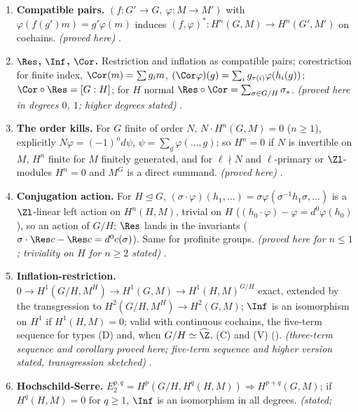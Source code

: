 \begin{enumerate}[label=\textbf{\thechapter.\arabic*}]
$\#A[\ell]\le\ell$ is cyclic of length the largest $k$ with an element of order $\ell^k$; if $\#H^0(G,T/\ell T)\le\ell$, $H^0(G,W)$ is finite cyclic or $\simeq\Qlmod$, and when finite its
length is the largest $k$ with an invariant element of $T/\ell^kT$ outside $\ell T/\ell^kT$. \emph{(proved here, given )} .
\item \textbf{Compatible pairs.} $(f\colon G'\to G,\ \varphi\colon M\to M')$ with $\varphi(f(g')m)=g'\varphi(m)$ induces $(f,\varphi)^*\colon H^n(G,M)\to H^n(G',M')$ on cochains. \emph{(proved here)}
.
\item \textbf{$\Res$, $\Inf$, $\Cor$.} Restriction and inflation as compatible pairs; corestriction for finite index, $\Cor(m)=\sum g_im$, $(\Cor\varphi)(g)=\sum_ig_{\tau(i)}\varphi(h_i(g))$;
$\Cor\circ\Res=[G:H]$; for $H$ normal $\Res\circ\Cor=\sum_{\sigma\in G/H}\sigma_*$. \emph{(proved here in degrees $0$, $1$; higher degrees stated)} .
\item \textbf{The order kills.} For $G$ finite of order $N$, $N\cdot H^n(G,M)=0$ ($n\ge1$), explicitly $N\varphi=(-1)^nd\psi$, $\psi=\sum_g\varphi(\dots,g)$; so $H^n=0$ if $N$ is invertible on $M$,
$H^n$ finite for $M$ finitely generated, and for $\ell\nmid N$ and $\ell$-primary or $\Zl$-modules $H^n=0$ and $M^G$ is a direct summand. \emph{(proved here)}
.
\item \textbf{Conjugation action.} For $H\trianglelefteq G$, $(\sigma\cdot\varphi)(h_1,\dots)=\sigma\varphi(\sigma^{-1}h_1\sigma,\dots)$ is a $\Zl$-linear left action on $H^n(H,M)$, trivial on $H$
($(h_0\cdot\varphi)-\varphi=d^0\varphi(h_0)$), so an action of $G/H$; $\Res$ lands in the invariants ($\sigma\cdot\Res c-\Res c=d^0c(\sigma)$). Same for profinite groups.
\emph{(proved here for $n\le1$; triviality on $H$ for $n\ge2$ stated)} .
\item \textbf{Inflation-restriction.} $0\to H^1(G/H,M^H)\to H^1(G,M)\to H^1(H,M)^{G/H}$ exact, extended by the transgression to $H^2(G/H,M^H)\to H^2(G,M)$; $\Inf$ is an isomorphism on
$H^1$ if $H^1(H,M)=0$; valid with continuous cochains, the five-term sequence for types (D) and, when $G/H\simeq\widehat\Z$, (C) and (V)
(). \emph{(three-term sequence and corollary proved here; five-term sequence and higher version stated, transgression
sketched)} .
\item \textbf{Hochschild-Serre.} $E_2^{p,q}=H^p(G/H,H^q(H,M))\Rightarrow H^{p+q}(G,M)$; if $H^q(H,M)=0$ for $q\ge1$, $\Inf$ is an isomorphism in all degrees. \emph{(stated;
}
\end{enumerate}
